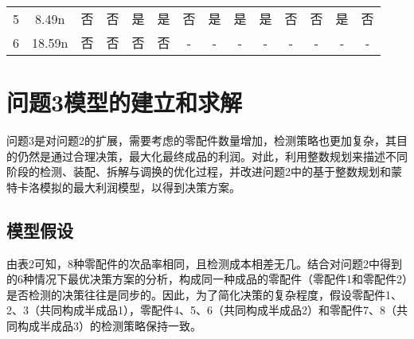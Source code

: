 \documentclass[withoutpreface,bwprint]{cumcmthesis} %
\begin{document}
\begin{table}[htbp]
{\begin{tabular}{c|c|cccc|cccc|cccc}
		5                   & 8.49n                 & 否                                                 & 否                                                 & 是                                               & 是                                                 & 否                                                 & 是                                                 & 是                                               & 是                                                 & 否                                                 & 否                                                 & 是                                               & 否                                                 \\
		6                   & 18.59n                & 否                                                 & 否                                                 & 否                                               & 否                                                 & -                                                 & -                                                 & -                                               & -                                                 & -                                                 & -                                                 & -                                               & -                                                 \\ 	\bottomrule[1.5pt]
	
	\end{tabular}
} \label{biao1}
\end{table}



\section{问题3模型的建立和求解}
问题3是对问题2的扩展，需要考虑的零配件数量增加，检测策略也更加复杂，其目的仍然是通过合理决策，最大化最终成品的利润。对此，利用整数规划来描述不同阶段的检测、装配、拆解与调换的优化过程，并改进问题2中的基于整数规划和蒙特卡洛模拟的最大利润模型，以得到决策方案。

\subsection{模型假设}
由表2可知，8种零配件的次品率相同，且检测成本相差无几。结合对问题2中得到的6种情况下最优决策方案的分析，构成同一种成品的零配件（零配件1和零配件2）是否检测的决策往往是同步的。因此，为了简化决策的复杂程度，假设零配件1、2、3（共同构成半成品1），零配件4、5、6（共同构成半成品2）和零配件7、8（共同构成半成品3）的检测策略保持一致。
\end{document}
